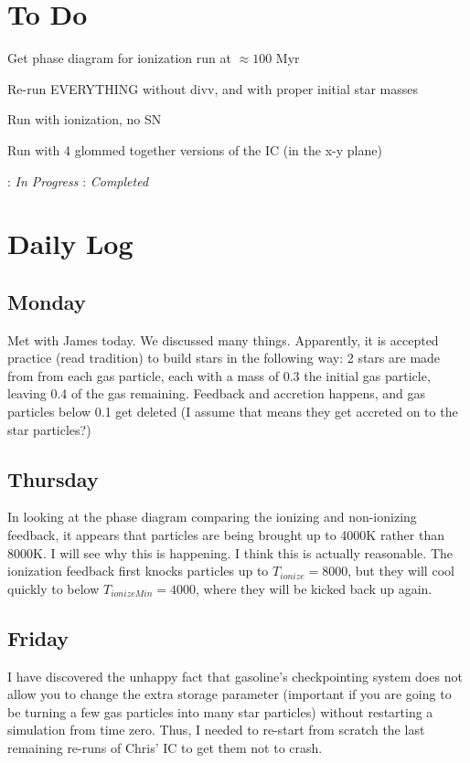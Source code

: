\documentclass[11pt,letterpaper]{article}
\begin{document}
\section{To Do}
\begin{bullets}
\item[\checkmark] Get phase diagram for ionization run at $\approx 100$ Myr
\item[\textleaf] Re-run EVERYTHING without divv, and with proper initial star masses
\item[\textleaf] Run with ionization, no SN
\item Run with 4 glommed together versions of the IC (in the x-y plane)
\end{bullets}

\textleaf : \textit{In Progress} \qquad \checkmark : \textit{Completed}
\section{Daily Log}

\subsection{Monday}

Met with James today. We discussed many things. Apparently, it is
accepted practice (read tradition) to build stars in the following way:
2 stars are made from from each gas particle, each with a mass of 0.3
the initial gas particle, leaving 0.4 of the gas remaining. Feedback and
accretion happens, and gas particles below 0.1 get deleted (I assume
that means they get accreted on to the star particles?)

\subsection{Thursday}

In looking at the phase diagram comparing the ionizing and non-ionizing
feedback, it appears that particles are being brought up to 4000K rather
than 8000K. I will see why this is happening. I think this is actually
reasonable. The ionization feedback first knocks particles up to
$T_{ionize}=8000$, but they will cool quickly to below
$T_{ionizeMin}=4000$, where they will be kicked back up again.

\subsection{Friday}

I have discovered the unhappy fact that gasoline's checkpointing system
does not allow you to change the extra storage parameter (important if
you are going to be turning a few gas particles into many star
particles) without restarting a simulation from time zero. Thus, I
needed to re-start from scratch the last remaining re-runs of Chris' IC
to get them not to crash.
\end{document}
